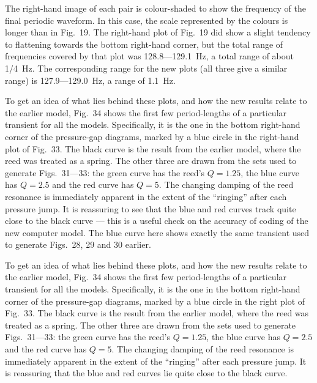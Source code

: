   The right-hand image of each pair is colour-shaded to show the frequency of 
  the final periodic waveform. In this case, the scale represented by the 
  colours is longer than in Fig.\ 19. The right-hand plot of Fig.\ 19 did show 
  a slight tendency to flattening towards the bottom right-hand corner, but the 
  total range of frequencies covered by that plot was 128.8—129.1~Hz, a total 
  range of about 1/4~Hz. The corresponding range for the new plots (all three 
  give a similar range) is 127.9—129.0~Hz, a range of 1.1~Hz. 

  To get an idea of what lies behind these plots, and how the new results 
  relate to the earlier model, Fig.\ 34 shows the first few period-lengths of a 
  particular transient for all the models. Specifically, it is the one in the 
  bottom right-hand corner of the pressure-gap diagrams, marked by a blue 
  circle in the right-hand plot of Fig.\ 33. The black curve is the result from 
  the earlier model, where the reed was treated as a spring. The other three 
  are drawn from the sets used to generate Figs.\ 31—33: the green curve has 
  the reed’s $Q=1.25$, the blue curve has $Q=2.5$ and the red curve has $Q=5$. 
  The changing damping of the reed resonance is immediately apparent in the 
  extent of the “ringing” after each pressure jump. It is reassuring to see 
  that the blue and red curves track quite close to the black curve --- this is 
  a useful check on the accuracy of coding of the new computer model. The blue 
  curve here shows exactly the same transient used to generate Figs.\ 28, 29 
  and 30 earlier. 

  To get an idea of what lies behind these plots, and how the new results 
  relate to the earlier model, Fig.\ 34 shows the first few period-lengths of a 
  particular transient for all the models. Specifically, it is the one in the 
  bottom right-hand corner of the pressure-gap diagrams, marked by a blue 
  circle in the right plot of Fig.\ 33. The black curve is the result from the 
  earlier model, where the reed was treated as a spring. The other three are 
  drawn from the sets used to generate Figs.\ 31—33: the green curve has the 
  reed’s $Q=1.25$, the blue curve has $Q=2.5$ and the red curve has $Q=5$. The 
  changing damping of the reed resonance is immediately apparent in the extent 
  of the “ringing” after each pressure jump. It is reassuring that the blue and 
  red curves lie quite close to the black curve. 


